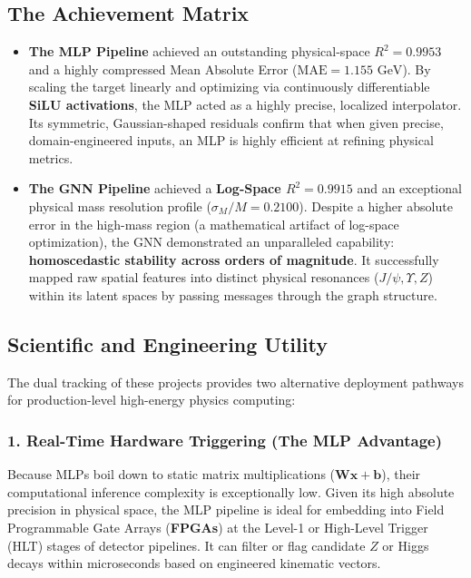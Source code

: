 \documentclass[11pt,a4paper,oneside]{article}
\begin{document}
\subsection*{The Achievement Matrix}
\begin{itemize}
    \item \textbf{The MLP Pipeline} achieved an outstanding physical-space $R^2 = 0.9953$ and a highly compressed Mean Absolute Error ($\text{MAE} = 1.155\text{ GeV}$). By scaling the target linearly and optimizing via continuously differentiable \textbf{SiLU activations}, the MLP acted as a highly precise, localized interpolator. Its symmetric, Gaussian-shaped residuals confirm that when given precise, domain-engineered inputs, an MLP is highly efficient at refining physical metrics.
    \item \textbf{The GNN Pipeline} achieved a \textbf{Log-Space $R^2 = 0.9915$} and an exceptional physical mass resolution profile ($\sigma_M/M = 0.2100$). Despite a higher absolute error in the high-mass region (a mathematical artifact of log-space optimization), the GNN demonstrated an unparalleled capability: \textbf{homoscedastic stability across orders of magnitude}. It successfully mapped raw spatial features into distinct physical resonances ($J/\psi, \Upsilon, Z$) within its latent spaces by passing messages through the graph structure.
\end{itemize}

\subsection*{Scientific and Engineering Utility}

The dual tracking of these projects provides two alternative deployment pathways for production-level high-energy physics computing:

\subsubsection*{1. Real-Time Hardware Triggering (The MLP Advantage)}
Because MLPs boil down to static matrix multiplications ($\mathbf{W}\mathbf{x} + \mathbf{b}$), their computational inference complexity is exceptionally low. Given its high absolute precision in physical space, the MLP pipeline is ideal for embedding into Field Programmable Gate Arrays (\textbf{FPGAs}) at the Level-1 or High-Level Trigger (HLT) stages of detector pipelines. It can filter or flag candidate $Z$ or Higgs decays within microseconds based on engineered kinematic vectors.
\end{document}
